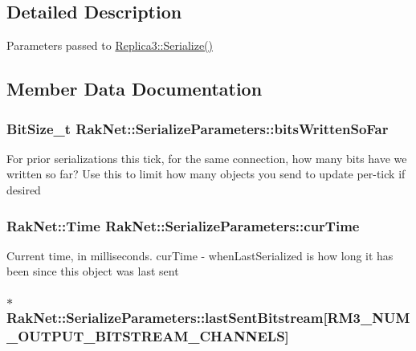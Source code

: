 \subsection{Detailed Description}
Parameters passed to \hyperlink{class_rak_net_1_1_replica3_a6e59b6a75b22441365145bf552f89e09}{Replica3\-::\-Serialize()} 

\subsection{Member Data Documentation}
\hypertarget{struct_rak_net_1_1_serialize_parameters_ac69a7436aa2040a35ba5c43079609321}{
\subsubsection[{bits\-Written\-So\-Far}]{\setlength{\rightskip}{0pt plus 5cm}Bit\-Size\-\_\-t Rak\-Net\-::\-Serialize\-Parameters\-::bits\-Written\-So\-Far}}\label{struct_rak_net_1_1_serialize_parameters_ac69a7436aa2040a35ba5c43079609321}
For prior serializations this tick, for the same connection, how many bits have we written so far? Use this to limit how many objects you send to update per-\/tick if desired \hypertarget{struct_rak_net_1_1_serialize_parameters_ad5a913a764faa0bf58e7503efbfd7233}{
\subsubsection[{cur\-Time}]{\setlength{\rightskip}{0pt plus 5cm}Rak\-Net\-::\-Time Rak\-Net\-::\-Serialize\-Parameters\-::cur\-Time}}\label{struct_rak_net_1_1_serialize_parameters_ad5a913a764faa0bf58e7503efbfd7233}
Current time, in milliseconds. cur\-Time -\/ when\-Last\-Serialized is how long it has been since this object was last sent \hypertarget{struct_rak_net_1_1_serialize_parameters_a3f827fa6ae16ed1f35efddf5696ae4e9}{
\subsubsection[{last\-Sent\-Bitstream}]{$\ast$ Rak\-Net\-::\-Serialize\-Parameters\-::last\-Sent\-Bitstream\mbox{[}R\-M3\-\_\-\-N\-U\-M\-\_\-\-O\-U\-T\-P\-U\-T\-\_\-\-B\-I\-T\-S\-T\-R\-E\-A\-M\-\_\-\-C\-H\-A\-N\-N\-E\-L\-S\mbox{]}}}\label{struct_rak_net_1_1_serialize_parameters_a3f827fa6ae16ed1f35efddf5696ae4e9}
